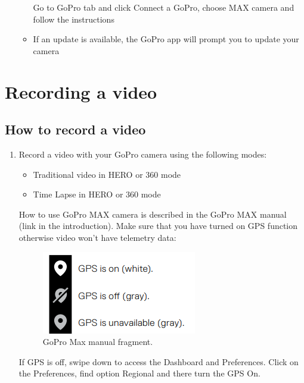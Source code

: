 \documentclass[a4paper,12pt]{book}
\begin{document}
\begin{enumerate}
\begin{itemize}
\begin{minipage}[t]{\linewidth}
{			}		
			\medskip	
		\end{minipage}
		Go to GoPro tab and click Connect a GoPro, choose MAX camera and follow the instructions
		\item If an update is available, the GoPro app will prompt you to update your camera
	\end{itemize}
\end{enumerate}

\chapter{Recording a video}
\section{How to record a video}
\begin{enumerate}
	\item Record a video with your GoPro camera using the following modes:
	\begin{itemize}
		\item Traditional video in HERO or 360 mode
		\item Time Lapse in HERO or 360 mode
	\end{itemize}
	How to use GoPro MAX camera is described in the GoPro MAX manual (link in the introduction). Make sure that you have turned on GPS function otherwise video won't have telemetry data:
	\begin{figure}[H]
		\centering
		\includegraphics{GoPro_manual_fragment}
		\caption{GoPro Max manual fragment.}
	\end{figure}
	If GPS is off, swipe down to access the Dashboard and Preferences. Click on the Preferences, find option Regional and there turn the GPS On.\\
\end{enumerate}
\end{document}
